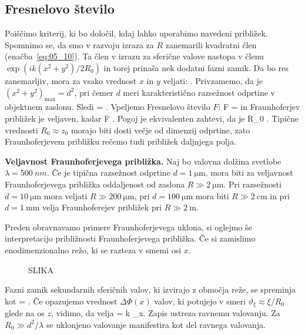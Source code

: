 \subsection*{Fresnelovo število}
Poiščimo kriterij, ki bo določil, kdaj lahko uporabimo navedeni približek. Spomnimo se, da smo
v razvoju izraza za $R$ zanemarili kvadratni člen (enačba~\ref{eq:05_10}). Ta člen v izrazu
za sferične valove nastopa v členu $\exp(ik(x^2 + y^2)/2R_0)$ in torej prinaša nek dodatni fazni 
zamik. Da bo res zanemarljiv, mora za vsako vrednost $x$ in $y$ veljati:
\beq
{}  \pi.
\label{eq:05_15}
\eeq
Privzamemo, da je $(x^2+y^2)_\mathrm{max} = d^2$, pri čemer $d$ meri karakteristično razsežnost 
odprtine v objektnem zaslonu. Sledi
\beq
{}  = \frac{2\pi}{\lambda} \pi.
\label{eq:05_16}
\eeq
Vpeljemo Fresnelovo število $F$:
\beq
F  = 
\label{eq:05_17}
\eeq
in Fraunhoferjev približek je veljaven, kadar
\beq
F . 
\label{eq:05_18}
\eeq
Pogoj je ekvivalenten zahtevi, da je 
\beq
R_0 \gg {}.
\label{eq:05_19}
\eeq
Tipične vrednosti $R_0 \approx z_0$  morajo biti dosti večje od dimenzij odprtine, zato 
Fraunhoferjevem približku rečemo tudi približek daljnjega polja. 

\begin{example}{\bf Veljavnost Fraunhoferjevega približka.}
Naj bo valovna dolžina svetlobe $\lambda = 500~\si{nm}$. Če je tipična razsežnost odprtine $d = 1~\si{\micro\metre}$,
mora biti za veljavnost Fraunhoferjevega približka oddaljenost od zaslona $R\gg 2~\si{\micro\metre}$. Pri razsežnosti
$d = 10~\si{\micro\metre}$ mora veljati $R\gg 200~\si{\micro\metre}$, pri $d = 100~\si{\micro\metre}$ mora biti
$R\gg 2~\si{\centi\metre}$ in pri $d = 1~\si{\milli\metre}$ velja Fraunhoferejev približek pri $R\gg 2~\si{\metre}$. 
\end{example}
 
Preden obravnavamo primere Fraunhoferjevega uklona, si oglejmo še interpretacijo približnosti Fraunhoferjevega
približka. Če si zamislimo enodimenzionalno režo, ki se razteza v smemi osi $x$. 
\begin{figure}[ht]
\centering
\def\svgwidth{120truemm} 
%
\caption{SLIKA}
\label{fig:05_priblizek}
\end{figure}

Fazni zamik sekundarnih sferičnih valov, ki izvirajo z območja reže, se spreminja kot
\beq
\Delta \Phi = .
\label{eq:05_20}
\eeq
Če opazujemo vrednost $\Delta \Phi(x)$ valov, ki potujejo v smeri $\vartheta_\xi \approx
\xi/R_0$ glede na os $z$, vidimo, da velja 
\beq
\Delta \Phi = k \varphi_\xi x.
\label{eq:05_21}
\eeq
Zapis ustreza ravnemu valovanju. Za $R_0 \gg d^2/\lambda$ se uklonjeno valovanje manifestira
kot del ravnega valovanja. 


